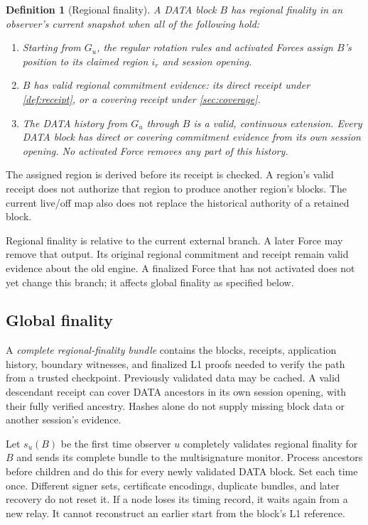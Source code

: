 \documentclass[11pt,a4paper]{article}
\newtheorem{definition}{Definition}[section]
\begin{document}
\begin{definition}[Regional finality]
\label{def:regional-finality}
A DATA block $B$ has regional finality in an observer's current snapshot
when all of the following hold:
\begin{enumerate}[label=(\roman*)]
\item Starting from $G_u$, the regular rotation rules and activated
Forces assign $B$'s position to its claimed region $i_r$ and session
opening.
\item $B$ has valid regional commitment evidence: its direct receipt
under \cref{def:receipt}, or a covering receipt under \cref{sec:coverage}.
\item The DATA history from $G_u$ through $B$ is a valid, continuous
extension. Every DATA block has direct or covering commitment evidence
from its own session opening. No
activated Force removes any part of this history.
\end{enumerate}
\end{definition}
The assigned region is derived before its receipt is checked. A region's
valid receipt does not authorize that region to produce another region's
blocks. The current live/off map also does not replace the historical
authority of a retained block.

Regional finality is relative to the current external branch. A later
Force may remove that output. Its original regional commitment and
receipt remain valid evidence about the old engine. A finalized Force
that has not activated does not yet change this branch; it affects
global finality as specified below.

\subsection{Global finality}
\label{sec:global-finality}
A \emph{complete regional-finality bundle} contains the blocks, receipts,
application history, boundary witnesses, and finalized L1 proofs needed
to verify the path from a trusted checkpoint. Previously validated data
may be cached. A valid descendant receipt can cover DATA ancestors in
its own session opening, with their fully verified ancestry. Hashes
alone do not supply missing block data or another session's evidence.

Let $s_u(B)$ be the first time observer $u$ completely validates regional
finality for $B$ and sends its complete bundle to the multisignature
monitor. Process ancestors before children and do this for every newly
validated DATA block. Set each time once. Different signer sets,
certificate encodings, duplicate bundles, and later recovery do not reset
it. If a node loses its timing record, it waits again from a new relay.
It cannot reconstruct an earlier start from the block's L1 reference.
\end{document}
